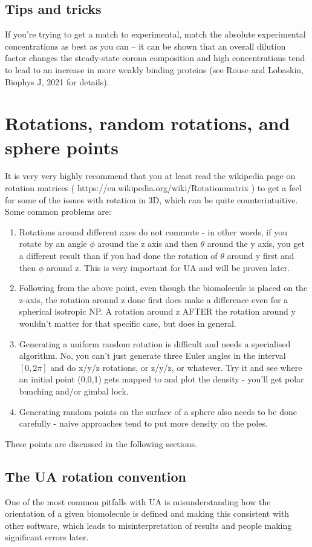 \documentclass[10pt,a4paper,onecolumn]{report}
\begin{document}
\section{Tips and tricks}
If you're trying to get a match to experimental, match the absolute experimental concentrations as best as you can -- it can be shown that an overall dilution factor changes the steady-state corona composition and high concentrations tend to lead to an increase in more weakly binding proteins (see Rouse and Lobaskin, Biophys J, 2021 for details). 
 
 
\appendix
\chapter{Rotations, random rotations, and sphere points}
 It is very very highly recommend that you at least read the wikipedia page on rotation matrices ( https:\slash \slash en.wikipedia.org\slash wiki\slash Rotation\textunderscore matrix ) to get a feel for some of the issues with rotation in 3D, which can be quite counterintuitive. Some common problems are:
\begin{enumerate}
\item Rotations around different axes do not commute - in other words, if you rotate by an angle $\phi$ around the z axis and then $\theta$ around the y axis, you get a different result than if you had done the rotation of $\theta$ around y first and then $\phi$ around z. This is very important for UA and will be proven later. 
\item Following from the above point, even though the biomolecule is placed on the z-axis, the rotation around z done first does make a difference even for a spherical isotropic NP. A rotation around z AFTER the rotation around y wouldn't matter for that specific case, but does in general. 
\item Generating a uniform random rotation is difficult and needs a specialised algorithm. No, you can't just generate three Euler angles in the interval $[0,2\pi]$ and do x/y/z rotations, or z/y/z, or whatever. Try it and see where an initial point (0,0,1) gets mapped to and plot the density - you'll get polar bunching and/or gimbal lock. 
\item Generating random points on the surface of a sphere also needs to be done carefully - naive approaches tend to put more density on the poles.
\end{enumerate}
These points are discussed in the following sections.

\section{The UA rotation convention} \label{section:uarotations}
One of the most common pitfalls with UA is misunderstanding how the orientation of a given biomolecule is defined and making this consistent with other software, which leads to misinterpretation of results and people making significant errors later. 
\end{document}
